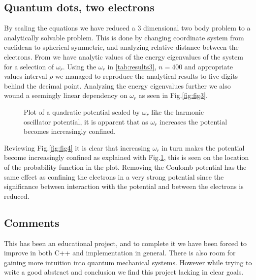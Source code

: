 \documentclass{emulateapj}
\begin{document}
\subsection{Quantum dots, two electrons}
%
By scaling the equations we have reduced a 3 dimensional two body problem to a analytically solvable problem. This is done by changing coordinate system from euclidean to spherical symmetric, and analyzing relative distance between the electrons. From \cite{3} we have analytic values of the energy eigenvalues of the system for a selection of $\omega_{r}$. Using the $\omega_r$ in \ref{tab:results3}, $n=400$ and appropriate values interval $\rho$ we managed to reproduce the analytical results to five digits behind the decimal point. Analyzing the energy eigenvalues further we also wound a seemingly linear dependency on $\omega_{r}$ as seen in Fig.\ref{fig:fig3}.
%
\begin{figure}[H]
\mbox{}
\caption{Plot of a quadratic potential scaled by $\omega_{r}$ like the harmonic oscillator potential, it is apparent that as $\omega_{r}$ increases the potential becomes increasingly confined.}
\label{fig:fig5}
\end{figure}
%
Reviewing Fig.\ref{fig:fig4} it is clear that increasing $\omega_{r}$ in turn makes the potential become increasingly confined as explained with Fig.\ref{fig:fig5}, this is seen on the location of the probability function in the plot. Removing the Coulomb potential has the same effect as confining the electrons in a very strong potential since the significance between interaction with the potential and between the electrons is reduced.
%
\subsection{Comments}
This has been an educational project, and to complete it we have been forced to improve in both C++ and implementation in general. There is also room for gaining more intuition into quantum mechanical systems. However while trying to write a good abstract and conclusion we find this project lacking in clear goals.

%
%
\end{document}
